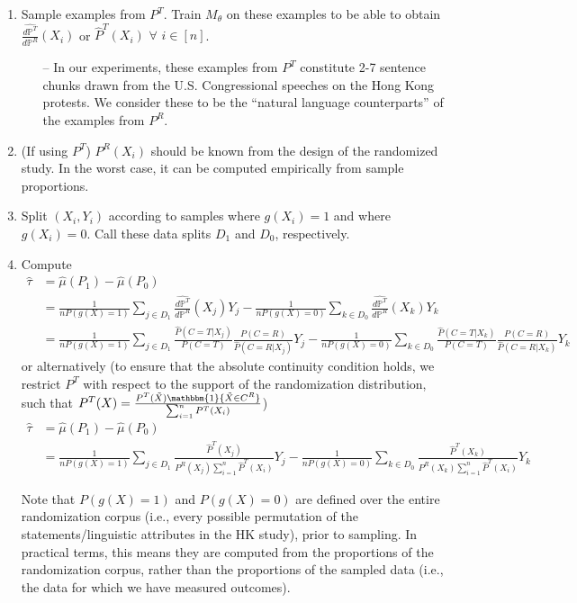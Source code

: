 \documentclass{article}
\newcommand{\vl}[1]{\textcolor{red}{[VL: #1]}}
\begin{document}
	\begin{enumerate}
		\item Sample examples from $P^T$. Train $M_\theta$ on these examples to be able to obtain $\frac{\hat{d \mathbb{P}^T}}{d \mathbb{P}^R}(X_i)$ or $\hat{P}^T(X_i)$ $\forall$ $i \in [n]$.
		\begin{itemize}
			\item[--] In our experiments, these examples from $P^T$ constitute 2-7 sentence chunks drawn from the U.S. Congressional speeches on the Hong Kong protests. We consider these to be the ``natural language counterparts'' of the examples from $P^R$.
		\end{itemize}
		\item (If using $P^T$) $P^R(X_i)$ should be known from the design of the randomized study. In the worst case, it can be computed empirically from sample proportions.
		\item Split $(X_i,Y_i)$ according to samples where $g(X_i)=1$ and where $g(X_i)=0$. Call these data splits $D_1$ and $D_0$, respectively.
		\item Compute
		\begin{equation*}
			\begin{split}
				\hat{\tau} &= \hat{\mu}(P_1) - \hat{\mu}(P_0) \\
				&= \frac{1}{nP(g(X)=1)} \sum_{j \in D_1} \frac{\hat{d \mathbb{P}^T}}{d \mathbb{P}^R}(X_j)Y_j - \frac{1}{nP(g(X)=0)} \sum_{k \in D_0} \frac{\hat{d \mathbb{P}^T}}{d \mathbb{P}^R}(X_k)Y_k \\
				&= \frac{1}{nP(g(X)=1)} \sum_{j \in D_1} \frac{\hat{P}(C=T|X_j)}{P(C=T)}\frac{P(C=R)}{\hat{P}(C=R|X_j)}Y_j - \frac{1}{nP(g(X)=0)} \sum_{k \in D_0} \frac{\hat{P}(C=T|X_k)}{P(C=T)}\frac{P(C=R)}{\hat{P}(C=R|X_k)}Y_k
			\end{split}
		\end{equation*}
		or alternatively (to ensure that the absolute continuity condition holds, we restrict $P^T$ with respect to the support of the randomization distribution, such that $P^T(X) = \frac{P^T(\tilde{X})\mathbbm{1}\{\tilde{X} \in C^R\}}{\sum_{i=1}^n P^T(X_i)}$)
		\begin{equation*}
			\begin{split}
				\hat{\tau} &= \hat{\mu}(P_1) - \hat{\mu}(P_0) \\
				&= \frac{1}{n P(g(X)=1)} \sum_{j \in D_1} \frac{\hat{P}^T(X_j)}{P^R(X_j)\sum_{i=1}^n \hat{P}^T(X_i)}Y_j - \frac{1}{nP(g(X)=0)} \sum_{k \in D_0} \frac{\hat{P}^T(X_k)}{P^R(X_k)\sum_{i=1}^n \hat{P}^T(X_i)}Y_k
			\end{split}
		\end{equation*}
		
		Note that $P(g(X)=1)$ and $P(g(X)=0)$ are defined over the entire randomization corpus (i.e., every possible permutation of the statements/linguistic attributes in the HK study), prior to sampling. In practical terms, this means they are computed from the  proportions of the randomization corpus, rather than the  proportions of the sampled data (i.e., the data for which we have measured outcomes).
	\end{enumerate}
	
\end{document}
